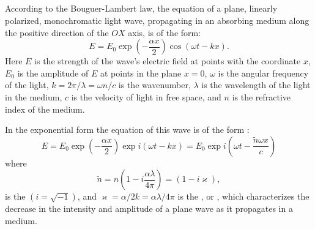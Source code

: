 \subsection{}\label{34.2.2} According to the Bouguer-Lambert law, the equation of a plane, linearly polarized, monochromatic light wave, propagating in an absorbing medium along the positive direction of the $OX$ axis, is of the form:
\begin{equation*}%
E = E_{0}\exp \left( - \frac{\alpha x}{2} \right) \cos ( \omega t- kx).
\end{equation*}
Here $E$ is the strength of the wave's electric field at points with the coordinate $x$, $E_{0}$ is the amplitude of $E$ at points in the plane $x = 0$, $\omega$ is the angular frequency of the light, $k = 2 \pi/\lambda = \omega n/c$ is the wavenumber, $\lambda$ is the wavelength of the light in
the medium, $c$ is the velocity of light in free space, and $n$ is the refractive index of the medium.

In the exponential form the equation of this wave is of the form :
\begin{equation*}%
E = E_{0}\exp \left( - \frac{\alpha x}{2} \right) \exp i \left( \omega t- kx \right) = E_{0} \exp i \left( \omega t- \dfrac{\tilde{n} \omega x}{c}  \right)
\end{equation*}
where 
\begin{equation*}%
\tilde{n} = n \left(1 - i \frac{\alpha \lambda}{4 \pi}\right) = (1 - i\varkappa),
\end{equation*}
is the  $(i = \sqrt{-1})$, and $\varkappa = \alpha/2k = \alpha \lambda/4\pi$ is the , or , which characterizes the decrease in the intensity and amplitude of a plane wave as it propagates in a medium.


